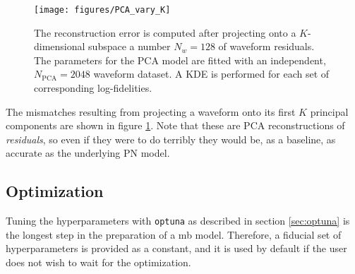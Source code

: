 \documentclass[main.tex]{subfiles}
\begin{document}
\begin{figure}[ht]
\centering
\texttt{[image: figures/PCA\_vary\_K]}
\caption{The reconstruction error is computed after projecting onto a \(K\)-dimensional subspace a number \(N_w=128\) of waveform residuals. The parameters for the \ac{PCA} model are fitted with an independent, \(N _{\text{PCA}} = 2048\) waveform dataset. A \ac{KDE} is performed for each set of corresponding log-fidelities.}
\label{fig:PCA_vary_K}
\end{figure}

The mismatches resulting from projecting a waveform onto its first \(K\) principal components are shown in figure \ref{fig:PCA_vary_K}.
Note that these are \ac{PCA} reconstructions of \emph{residuals}, so even if they were to do terribly they would be, as a baseline, as accurate as the underlying \ac{PN} model. 


\subsection{Optimization} \label{sec:optimization}

Tuning the hyperparameters with \texttt{optuna} as described in section \ref{sec:optuna} is the longest step in the preparation of a \ac{mb} model. 
Therefore, a fiducial set of hyperparameters is provided as a constant, and it is used by default if the user does not wish to wait for the optimization. 
\end{document}
